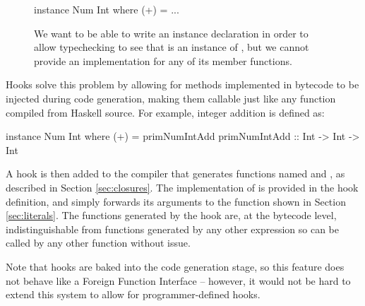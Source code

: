 \documentclass[dissertation.tex]{subfiles}
\begin{document}
{{        \begin{figure}[h]
        \begin{haskellfigure}
        instance Num Int where
            (+) = ...
        \end{haskellfigure}
        \caption{We want to be able to write an instance declaration in order to allow typechecking to see that  is an instance of , but we cannot provide an implementation for any of its member functions.}
        \end{figure}

        Hooks solve this problem by allowing for methods implemented in bytecode to be injected during code generation, making them callable just like any function compiled from Haskell source. For example, integer addition is defined as:

        \begin{haskellfigure}
        instance Num Int where
            (+) = primNumIntAdd
        primNumIntAdd :: Int -> Int -> Int
        \end{haskellfigure}

        A hook is then added to the compiler that generates functions named  and , as described in Section \ref{sec:closures}. The implementation of  is provided in the hook definition, and simply forwards its arguments to the  function shown in Section \ref{sec:literals}. The functions generated by the hook are, at the bytecode level, indistinguishable from functions generated by any other expression so can be called by any other function without issue.

        Note that hooks are baked into the code generation stage, so this feature does not behave like a Foreign Function Interface -- however, it would not be hard to extend this system to allow for programmer-defined hooks.
    }
}
\end{document}
